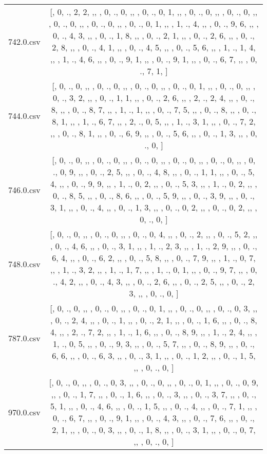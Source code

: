 \begin{table}[ht]
\begin{tabular}{@{}c c@{}}
	742.0.csv & [, 0, ., 2, 2, ,,  , 0, ., 0, ,,  , 0, ., 0, 1, ,,  , 0, ., 0, ,,  , 0, ., 0, ,,  , 0, ., 0, ,,  , 0, ., 0, ,,  , 0, ., 0, 1, ,,  , 1, ., 4, ,,  , 0, ., 9, 6, ,,  , 0, ., 4, 3, ,,  , 0, ., 1, 8, ,,  , 0, ., 2, 1, ,,  , 0, ., 2, 6, ,,  , 0, ., 2, 8, ,,  , 0, ., 4, 1, ,,  , 0, ., 4, 5, ,,  , 0, ., 5, 6, ,,  , 1, ., 1, 4, ,,  , 1, ., 4, 6, ,,  , 0, ., 9, 1, ,,  , 0, ., 9, 1, ,,  , 0, ., 6, 7, ,,  , 0, ., 7, 1, ]\\ 
	744.0.csv & [, 0, ., 0, ,,  , 0, ., 0, ,,  , 0, ., 0, ,,  , 0, ., 0, 1, ,,  , 0, ., 0, ,,  , 0, ., 3, 2, ,,  , 0, ., 1, 1, ,,  , 0, ., 2, 6, ,,  , 2, ., 2, 4, ,,  , 0, ., 8, ,,  , 0, ., 8, 7, ,,  , 1, ., 1, ,,  , 0, ., 7, 5, ,,  , 0, ., 8, ,,  , 0, ., 8, 1, ,,  , 1, ., 6, 7, ,,  , 2, ., 0, 5, ,,  , 1, ., 3, 1, ,,  , 0, ., 7, 2, ,,  , 0, ., 8, 1, ,,  , 0, ., 6, 9, ,,  , 0, ., 5, 6, ,,  , 0, ., 1, 3, ,,  , 0, ., 0, ]\\ 
	746.0.csv & [, 0, ., 0, ,,  , 0, ., 0, ,,  , 0, ., 0, ,,  , 0, ., 0, ,,  , 0, ., 0, ,,  , 0, ., 0, 9, ,,  , 0, ., 2, 5, ,,  , 0, ., 4, 8, ,,  , 0, ., 1, 1, ,,  , 0, ., 5, 4, ,,  , 0, ., 9, 9, ,,  , 1, ., 0, 2, ,,  , 0, ., 5, 3, ,,  , 1, ., 0, 2, ,,  , 0, ., 8, 5, ,,  , 0, ., 8, 6, ,,  , 0, ., 5, 9, ,,  , 0, ., 3, 9, ,,  , 0, ., 3, 1, ,,  , 0, ., 4, ,,  , 0, ., 1, 3, ,,  , 0, ., 0, 2, ,,  , 0, ., 0, 2, ,,  , 0, ., 0, ]\\ 
	748.0.csv & [, 0, ., 0, ,,  , 0, ., 0, ,,  , 0, ., 0, 4, ,,  , 0, ., 2, ,,  , 0, ., 5, 2, ,,  , 0, ., 4, 6, ,,  , 0, ., 3, 1, ,,  , 1, ., 2, 3, ,,  , 1, ., 2, 9, ,,  , 0, ., 6, 4, ,,  , 0, ., 6, 2, ,,  , 0, ., 5, 8, ,,  , 0, ., 7, 9, ,,  , 1, ., 0, 7, ,,  , 1, ., 3, 2, ,,  , 1, ., 1, 7, ,,  , 1, ., 0, 1, ,,  , 0, ., 9, 7, ,,  , 0, ., 4, 2, ,,  , 0, ., 4, 3, ,,  , 0, ., 2, 6, ,,  , 0, ., 2, 5, ,,  , 0, ., 2, 3, ,,  , 0, ., 0, ]\\ 
	787.0.csv & [, 0, ., 0, ,,  , 0, ., 0, ,,  , 0, ., 0, 1, ,,  , 0, ., 0, ,,  , 0, ., 0, 3, ,,  , 0, ., 2, 4, ,,  , 0, ., 1, ,,  , 0, ., 2, 1, ,,  , 0, ., 1, 6, ,,  , 0, ., 8, 4, ,,  , 2, ., 7, 2, ,,  , 1, ., 1, 6, ,,  , 0, ., 8, 9, ,,  , 1, ., 2, 4, ,,  , 1, ., 0, 5, ,,  , 0, ., 9, 3, ,,  , 0, ., 5, 7, ,,  , 0, ., 8, 9, ,,  , 0, ., 6, 6, ,,  , 0, ., 6, 3, ,,  , 0, ., 3, 1, ,,  , 0, ., 1, 2, ,,  , 0, ., 1, 5, ,,  , 0, ., 0, ]\\ 
	970.0.csv & [, 0, ., 0, ,,  , 0, ., 0, 3, ,,  , 0, ., 0, ,,  , 0, ., 0, 1, ,,  , 0, ., 0, 9, ,,  , 0, ., 1, 7, ,,  , 0, ., 1, 6, ,,  , 0, ., 3, ,,  , 0, ., 3, 7, ,,  , 0, ., 5, 1, ,,  , 0, ., 4, 6, ,,  , 0, ., 1, 5, ,,  , 0, ., 4, ,,  , 0, ., 7, 1, ,,  , 0, ., 6, 7, ,,  , 0, ., 9, 1, ,,  , 0, ., 4, 3, ,,  , 0, ., 7, 6, ,,  , 0, ., 2, 1, ,,  , 0, ., 0, 3, ,,  , 0, ., 1, 8, ,,  , 0, ., 3, 1, ,,  , 0, ., 0, 7, ,,  , 0, ., 0, ]\\
	\bottomrule
\end{tabular}
\label{table:nonlin}
\end{table}
